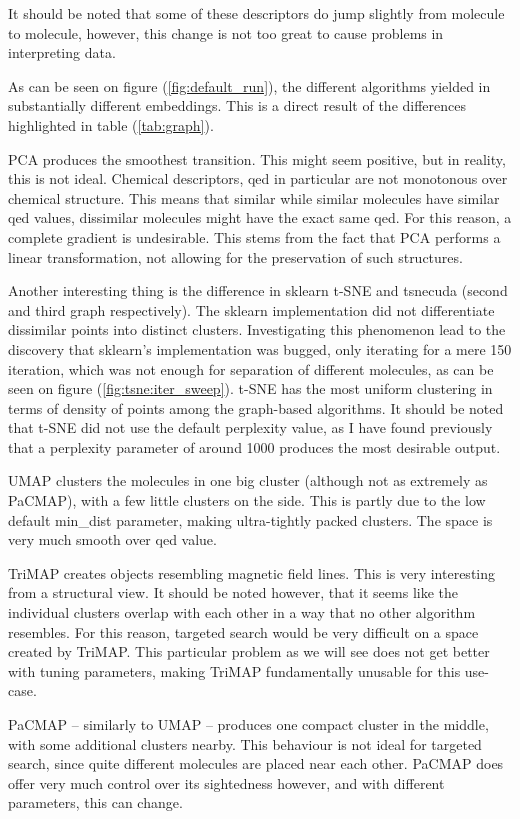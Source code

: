 It should be noted that some of these descriptors do jump slightly from molecule to molecule, however, this change is not too great to cause problems in interpreting data.

As can be seen on figure (\ref{fig:default_run}), the different algorithms yielded in substantially different embeddings. This is a direct result of the differences highlighted in table (\ref{tab:graph}). 

PCA produces the smoothest transition. This might seem positive, but in reality, this is not ideal. Chemical descriptors, qed in particular are not monotonous over chemical structure. This means that similar while similar molecules have similar qed values, dissimilar molecules might have the exact same qed. For this reason, a complete gradient is undesirable. This stems from the fact that PCA performs a linear transformation, not allowing for the preservation of such structures.

Another interesting thing is the difference in sklearn t-SNE and tsnecuda (second and third graph respectively). The sklearn implementation did not differentiate dissimilar points into distinct clusters. Investigating this phenomenon lead to the discovery that sklearn's implementation was bugged, only iterating for a mere 150 iteration, which was not enough for separation of different molecules, as can be seen on figure (\ref{fig:tsne:iter_sweep}). t-SNE has the most uniform clustering in terms of density of points among the graph-based algorithms. It should be noted that t-SNE did not use the default perplexity value, as I have found previously that a perplexity parameter of around 1000 produces the most desirable output. 

UMAP clusters the molecules in one big cluster (although not as extremely as PaCMAP), with a few little clusters on the side. This is partly due to the low default min\_dist parameter, making ultra-tightly packed clusters. The space is very much smooth over qed value. 

TriMAP creates objects resembling magnetic field lines. This is very interesting from a structural view. It should be noted however, that it seems like the individual clusters overlap with each other in a way that no other algorithm resembles. For this reason, targeted search would be very difficult on a space created by TriMAP. This particular problem as we will see does not get better with tuning parameters, making TriMAP fundamentally unusable for this use-case.

PaCMAP -- similarly to UMAP -- produces one compact cluster in the middle, with some additional clusters nearby. This behaviour is not ideal for targeted search, since quite different molecules are placed near each other. PaCMAP does offer very much control over its sightedness however, and with different parameters, this can change.

